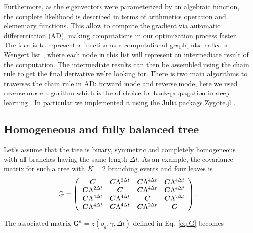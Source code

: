 \documentclass[preprint,amsmath,amssymb,superscriptaddress,showpacs,pre]{revtex4-1}
\let\originalleft\left
\let\originalright\right
\renewcommand{\left}{\mathopen{}\mathclose\bgroup\originalleft}
\renewcommand{\right}{\aftergroup\egroup\originalright}
\begin{document}
 Furthermore, as the eigenvectors were parameterized by an algebraic function, the complete likelihood  is described in terms of arithmetics operation and elementary functions. This allow to compute  the gradient via  automatic differentiation (AD), making computations in our optimization process faster. 
 The idea  is to represent a function as a computational graph, also called a Wengert list , where each node  in this list will represent an intermediate result of the computation. The intermediate results can then be assembled using the chain rule to get the final derivative we’re looking for. There is two    main algorithms  to traverses the chain rule in AD: forward mode and reverse mode, here we used reverse mode  algorithm  which is the of choice for back-propagation in deep learning . In particular we implemented  it using the Julia package Zygote.jl . 
 
 \subsection{Homogeneous and fully balanced tree}
 \label{sub:homogeneous_and_fully_balanced_tree}

Let's assume that the tree is binary, symmetric and completely homogeneous with all branches having the same length $\Delta t$. 
As an example, the covariance matrix for such a tree with $K=2$ branching events and four leaves is
\begin{equation} 
\mathbb{G} =  \left(
\begin{array}{cccc}
{ \bm C} & {\bm C} \Lambda ^{2\Delta t} & {\bm C} \Lambda ^{4\Delta t} & {\bm C} \Lambda ^{4\Delta t} \\
{\bm C} \Lambda ^{2\Delta t} & {\bm C} & {\bm C} \Lambda ^{4\Delta t} & {\bm C} \Lambda ^{4\Delta t} \\
{\bm C} \Lambda ^{4\Delta t} & {\bm C} \Lambda ^{4\Delta t} & {\bm C} & {\bm C} \Lambda ^{2\Delta t} \\
{\bm C} \Lambda ^{4\Delta t} & {\bm C} \Lambda ^{4\Delta t} & {\bm C} \Lambda ^{2\Delta t} & {\bm C} \\
\end{array}\label{eq:G}
\right).
\end{equation}

The associated matrix $\bm G^a=z(\rho_a,\gamma,\Delta t)$  defined in Eq.~\eqref{eq:G} becomes
\end{document}
